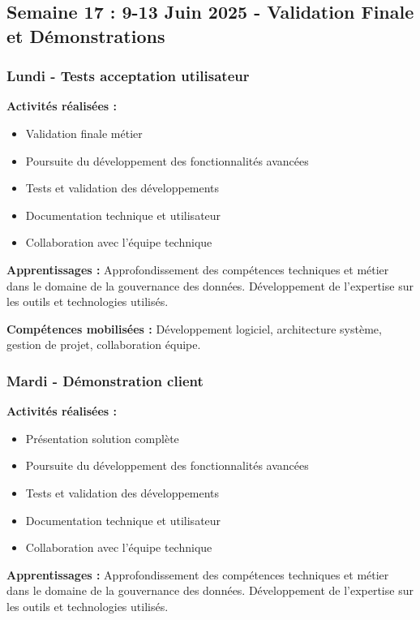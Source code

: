 \subsection{Semaine 17 : 9-13 Juin 2025 - Validation Finale et Démonstrations}

\subsubsection{Lundi - Tests acceptation utilisateur}

\textbf{Activités réalisées :}
\begin{itemize}
    \item Validation finale métier
    \item Poursuite du développement des fonctionnalités avancées
    \item Tests et validation des développements
    \item Documentation technique et utilisateur
    \item Collaboration avec l'équipe technique
\end{itemize}

\textbf{Apprentissages :}
Approfondissement des compétences techniques et métier dans le domaine de la gouvernance des données. Développement de l'expertise sur les outils et technologies utilisés.

\textbf{Compétences mobilisées :}
Développement logiciel, architecture système, gestion de projet, collaboration équipe.

\subsubsection{Mardi - Démonstration client}

\textbf{Activités réalisées :}
\begin{itemize}
    \item Présentation solution complète
    \item Poursuite du développement des fonctionnalités avancées
    \item Tests et validation des développements
    \item Documentation technique et utilisateur
    \item Collaboration avec l'équipe technique
\end{itemize}

\textbf{Apprentissages :}
Approfondissement des compétences techniques et métier dans le domaine de la gouvernance des données. Développement de l'expertise sur les outils et technologies utilisés.


